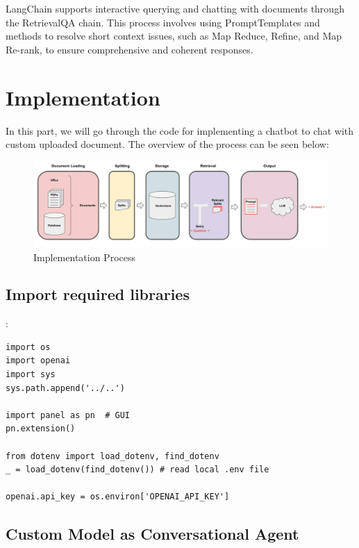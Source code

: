 \documentclass{article}
\begin{document}
LangChain supports interactive querying and chatting with documents through the RetrievalQA chain. This process involves using PromptTemplates and methods to resolve short context issues, such as Map Reduce, Refine, and Map Re-rank, to ensure comprehensive and coherent responses.

\pagebreak

\section{Implementation}

In this part, we will go through the code for implementing a chatbot to chat with custom uploaded document. The overview of the process can be seen below:

\begin{figure}[h]
    \centering
    \includegraphics[width=1\textwidth]{Images/Process.png}
    \caption{Implementation Process}
    \label{fig:example}
\end{figure}


\vspace{4cm}


\subsection{Import required libraries}:

\begin{lstlisting}[style=pythonstyle, caption={Python Code for OpenAI API Key Setup}]
import os
import openai
import sys
sys.path.append('../..')

import panel as pn  # GUI
pn.extension()

from dotenv import load_dotenv, find_dotenv
_ = load_dotenv(find_dotenv()) # read local .env file

openai.api_key = os.environ['OPENAI_API_KEY']
\end{lstlisting}

\pagebreak

\subsection{Custom Model as Conversational Agent}
\end{document}
